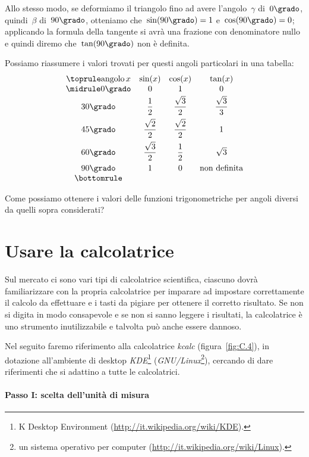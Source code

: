 Allo stesso modo, se deformiamo il triangolo fino ad avere l'angolo~$\gamma$ di~$0\grado$, quindi~$\beta$ di~$90\grado$, otteniamo
che~$\sin(90\grado)=1$ e~$\cos(90\grado)=0$; applicando la formula della tangente si avrà una frazione con denominatore nullo e
quindi diremo che~$\tan(90\grado)$ non è definita.

Possiamo riassumere i valori trovati per questi angoli particolari in una tabella:
\[
\begin{array}{cccc}
\toprule
\text{angolo}\, x & \sin(x)&\cos(x) & \tan(x)\\
\midrule
0\grado & 0 & 1 & 0\\[2pt]
30\grado & \dfrac{1}{2} & \dfrac{\sqrt{3}}{2} & \dfrac{\sqrt{3}}{3}\\[8pt]
45\grado & \dfrac{\sqrt{2}}{2} & \dfrac{\sqrt{2}}{2} & 1\\[8pt]
60\grado & \dfrac{\sqrt{3}}{2} & \dfrac{1}{2} & \sqrt{3}\\[7pt]
90\grado & 1 & 0 & \text{non definita}\\
\bottomrule
\end{array}
\]

Come possiamo ottenere i valori delle funzioni trigonometriche per angoli diversi da quelli sopra considerati?

\section{Usare la calcolatrice}

Sul mercato ci sono vari tipi di calcolatrice scientifica, ciascuno dovrà familiarizzare con la propria calcolatrice per imparare
ad impostare correttamente il calcolo da effettuare e i tasti da pigiare per ottenere il corretto risultato. Se non si digita in
modo consapevole e se non si sanno leggere i risultati, la calcolatrice è uno strumento inutilizzabile e talvolta può anche essere dannoso.

Nel seguito faremo riferimento alla calcolatrice \emph{kcalc} (figura~\ref{fig:C.4}), in dotazione all'ambiente di desktop \emph{KDE}\footnote{K Desktop Environment (\url{http://it.wikipedia.org/wiki/KDE}).} (\emph{GNU/Linux}\footnote{un sistema operativo per computer (\url{http://it.wikipedia.org/wiki/Linux}).}), cercando di dare
riferimenti che si adattino a tutte le calcolatrici.

\paragraph{Passo I: scelta dell'unità di misura}

